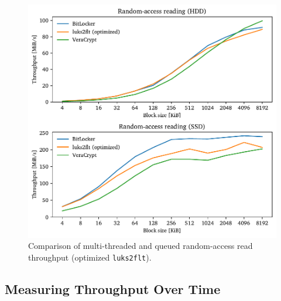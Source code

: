 \begin{figure}[htb!]
	\center
	\includegraphics[scale=1]{../fig/performance.results.optrandthreadsqueue.pdf}
	\caption[
		Comparison of multi-threaded and queued random-access read throughput (optimized \texttt{luks2flt})
	]{
		Comparison of multi-threaded and queued random-access read throughput (optimized \texttt{luks2flt}). 
	}
	\label{fig:performance.results.optrandthreadsqueue}
\end{figure}

\subsection{Measuring Throughput Over Time}
\label{chap:performance.results.throughputovertime}
